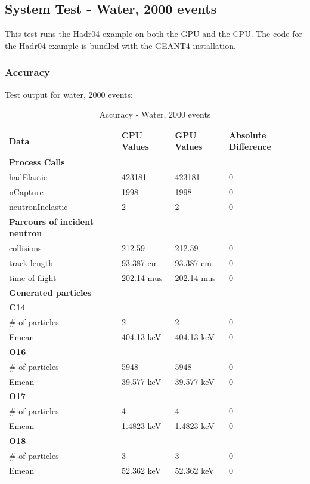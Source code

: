 \documentclass[12pt]{article}
\begin{document}
\subsection{System Test - Water, 2000 events}
This test runs the Hadr04 example on both the GPU and the CPU. The code for the Hadr04 example is bundled with the GEANT4 installation.
	\subsubsection{Accuracy}
	Test output for water, 2000 events:
		\begin{table}[H]
		\centering
		\caption{Accuracy - Water, 2000 events}\label{sys1Acc}
		\begin{tabular}{llll}
		\toprule
		\bf Data & \bf CPU Values & \bf GPU Values & \bf Absolute Difference\\\midrule
		\bf Process Calls&&&\\
		hadElastic&423181&423181&0\\
		nCapture&1998&1998&0\\
		neutronInelastic&2&2&0\\ 

		\midrule
		\bf Parcours of incident neutron&&&\\
		collisions&212.59&212.59&0\\
		track length&93.387 cm&93.387 cm&0\\
		time of flight&202.14 mus&202.14 mus&0\\
	
		\midrule
		\bf Generated particles&&&\\

		\bf{C14}&&&\\
		\# of particles&2&2&0\\
		Emean&404.13 keV&404.13 keV&0\\

		\bf{O16}&&&\\
		\# of particles&5948&5948&0\\
		Emean&39.577 keV&39.577 keV&0\\
		
		\bf{O17}&&&\\
		\# of particles&4&4&0\\
		Emean&1.4823 keV&1.4823 keV&0\\
		
		\bf{O18}&&&\\
		\# of particles&3&3&0\\
		Emean&52.362 keV&52.362 keV&0\\
		

\end{tabular}
\end{table}
\end{document}

